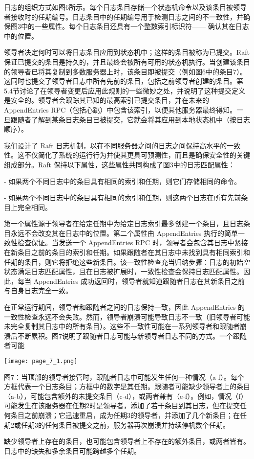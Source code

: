 \documentclass[12pt,a4paper]{report} %
\begin{document}
日志的组织方式如图6所示。每个日志条目存储一个状态机命令以及该条目被领导者接收时的任期编号。日志条目中的任期编号用于检测日志之间的不一致性，并确保图3中的一些属性。每个日志条目还具有一个整数索引标识符——
确认其在日志中的位置。

领导者决定何时可以将日志条目应用到状态机中；这样的条目被称为已提交。Raft 保证已提交的条目是持久的，并且最终会被所有可用的状态机执行。当创建该条目的领导者已将其复制到多数服务器上时，该条目即被提交（例如图6中的条目7）。这同时也提交了领导者日志中所有先前的条目，包括之前领导者创建的条目。第5.4节讨论了在领导者变更后应用此规则的一些微妙之处，并说明了这种提交定义是安全的。领导者会跟踪其已知的最高索引已提交条目，并在未来的 AppendEntries RPC（包括心跳）中包含该索引，以便其他服务器最终得知。一旦跟随者了解到某条日志条目已被提交，它就会将其应用到本地状态机中（按日志顺序）。

我们设计了 Raft 日志机制，以在不同服务器之间的日志之间保持高水平的一致性。这不仅简化了系统的运行行为并使其更具可预测性，而且是确保安全性的关键组成部分。Raft 保持以下属性，这些属性共同构成了图3中的日志匹配属性：

- 如果两个不同日志中的条目具有相同的索引和任期，则它们存储相同的命令。

- 如果两个不同日志中的条目具有相同的索引和任期，则这两个日志在所有先前条目上完全相同。

第一个属性源于领导者在给定任期中为给定日志索引最多创建一个条目，且日志条目永远不会改变其在日志中的位置。第二个属性由 AppendEntries 执行的简单一致性检查保证。当发送一个 AppendEntries RPC 时，领导者会包含其日志中紧接在新条目之前的条目的索引和任期。如果跟随者在其日志中未找到具有相同索引和任期的条目，则它将拒绝这些新条目。该一致性检查充当归纳步骤：日志的初始空状态满足日志匹配属性，且在日志被扩展时，一致性检查会保持日志匹配属性。因此，每当 AppendEntries 成功返回时，领导者就知道跟随者日志在其新条目之前与自身日志完全一致。

在正常运行期间，领导者和跟随者之间的日志保持一致，因此 AppendEntries 的一致性检查永远不会失败。然而，领导者崩溃可能导致日志不一致（旧领导者可能未完全复制其日志中的所有条目）。这些不一致性可能在一系列领导者和跟随者崩溃后不断累积。图7说明了跟随者日志可能与新领导者日志不同的方式。一个跟随者可能

\begin{center}
\texttt{[image: page\_7\_1.png]}
\end{center}
\begin{center} 图7：当顶部的领导者接管时，跟随者日志中可能发生任何一种情况（a-f）。每个方框代表一个日志条目；方框中的数字是其任期。跟随者可能缺少领导者上的条目（a-b），可能包含额外的未提交条目（c-d），或两者兼有（e-f）。例如，情况（f）可能发生在该服务器在任期2时是领导者，添加了若干条目到其日志，但在提交任何条目之前崩溃；它迅速重启，成为任期3的领导者，并添加了几个新条目；在任期2或任期3的任何条目被提交之前，服务器再次崩溃并持续停机数个任期。

\end{center} 缺少领导者上存在的条目，也可能包含领导者上不存在的额外条目，或两者皆有。日志中的缺失和多余条目可能跨越多个任期。
\end{document}
